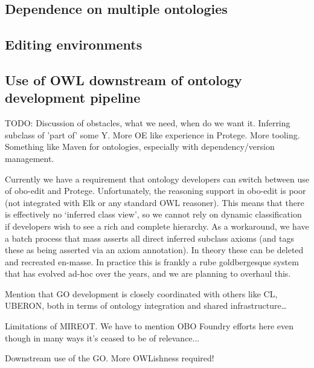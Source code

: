 \documentclass{llncs}
\begin{document}
\subsection{Dependence on multiple ontologies}


\subsection{Editing environments}

\subsection{Use of OWL downstream of ontology development pipeline}


TODO: Discussion of obstacles, what we need, when do we want it. Inferring
subclass of 'part of' some Y. More OE like experience in Protege. More
tooling. Something like Maven for ontologies, especially with
dependency/version management.

Currently we have a requirement that ontology developers can switch between use of obo-edit and Protege. Unfortunately, the reasoning support in obo-edit is poor (not integrated with Elk or any standard OWL reasoner). This means that there is effectively no ‘inferred class view’, so we cannot rely on dynamic classification if developers wish to see a rich and complete hierarchy. As a workaround, we have a batch process that mass asserts all direct inferred subclass axioms (and tags these as being asserted via an axiom annotation). In theory these can be deleted and recreated en-masse. In practice this is frankly a rube goldbergesque system that has evolved ad-hoc over the years, and we are planning to overhaul this.

Mention that GO development is closely coordinated with others like CL, UBERON, both in terms of ontology integration and shared infrastructure…

Limitations of MIREOT. We have to mention OBO Foundry efforts here even though in many ways it’s ceased to be of relevance...

Downstream use of the GO. More OWLishness required!
\end{document}
